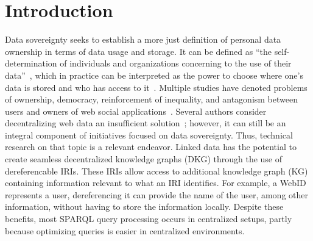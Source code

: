 \section{Introduction}

Data sovereignty seeks to establish a more just definition of personal data ownership in terms of data usage and storage.
It can be defined as ``the self-determination of individuals and organizations concerning to the use of their data''~\cite{verstraete2022solid},
which in practice can be interpreted as the power to choose where one's data is stored and who has access to it~\cite{verstraete2022solid}.
Multiple studies have denoted problems of ownership, democracy, reinforcement of inequality, and antagonism between users and owners of web social applications~\cite{Terranova2000FreeLP, Curran2016ch1, Sevignani2013, 9663788}.
Several authors consider decentralizing web data an insufficient solution~\cite{9663788, Curran2016ch1}; however, it can still be an integral component of initiatives focused on data sovereignty.
Thus, technical research on that topic is a relevant endeavor.
Linked data has the potential to create seamless decentralized knowledge graphs (DKG) through the use of dereferencable IRIs.
These IRIs allow access to additional knowledge graph (KG) containing information relevant to what an IRI identifies.
For example, a WebID~ represents a user, dereferencing it can provide the name of the user, among other information, without having to store the information locally.
Despite these benefits, most SPARQL query processing occurs in centralized setups, partly because optimizing queries is easier in centralized environments.

